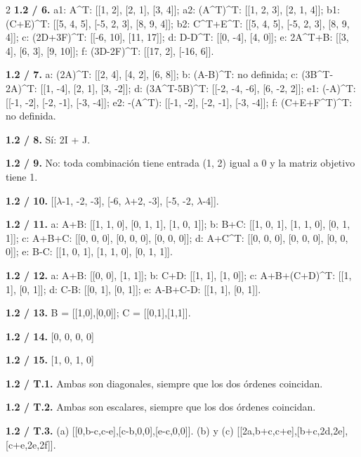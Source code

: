 \documentclass[11pt,a4paper,landscape]{article}
\begin{document}
\begin{multicols}{2}
\textbf{1.2 / 6.} a1: A\textasciicircum{}T: [[1, 2], [2, 1], [3, 4]]; a2: (A\textasciicircum{}T)\textasciicircum{}T: [[1, 2, 3], [2, 1, 4]]; b1: (C+E)\textasciicircum{}T: [[5, 4, 5], [-5, 2, 3], [8, 9, 4]]; b2: C\textasciicircum{}T+E\textasciicircum{}T: [[5, 4, 5], [-5, 2, 3], [8, 9, 4]]; c: (2D+3F)\textasciicircum{}T: [[-6, 10], [11, 17]]; d: D-D\textasciicircum{}T: [[0, -4], [4, 0]]; e: 2A\textasciicircum{}T+B: [[3, 4], [6, 3], [9, 10]]; f: (3D-2F)\textasciicircum{}T: [[17, 2], [-16, 6]].\par\smallskip
\textbf{1.2 / 7.} a: (2A)\textasciicircum{}T: [[2, 4], [4, 2], [6, 8]]; b: (A-B)\textasciicircum{}T: no definida; c: (3B\textasciicircum{}T-2A)\textasciicircum{}T: [[1, -4], [2, 1], [3, -2]]; d: (3A\textasciicircum{}T-5B)\textasciicircum{}T: [[-2, -4, -6], [6, -2, 2]]; e1: (-A)\textasciicircum{}T: [[-1, -2], [-2, -1], [-3, -4]]; e2: -(A\textasciicircum{}T): [[-1, -2], [-2, -1], [-3, -4]]; f: (C+E+F\textasciicircum{}T)\textasciicircum{}T: no definida.\par\smallskip
\textbf{1.2 / 8.} Sí: 2I + J.\par\smallskip
\textbf{1.2 / 9.} No: toda combinación tiene entrada (1, 2) igual a 0 y la matriz objetivo tiene 1.\par\smallskip
\textbf{1.2 / 10.} [[$\lambda$-1, -2, -3], [-6, $\lambda$+2, -3], [-5, -2, $\lambda$-4]].\par\smallskip
\textbf{1.2 / 11.} a: A+B: [[1, 1, 0], [0, 1, 1], [1, 0, 1]]; b: B+C: [[1, 0, 1], [1, 1, 0], [0, 1, 1]]; c: A+B+C: [[0, 0, 0], [0, 0, 0], [0, 0, 0]]; d: A+C\textasciicircum{}T: [[0, 0, 0], [0, 0, 0], [0, 0, 0]]; e: B-C: [[1, 0, 1], [1, 1, 0], [0, 1, 1]].\par\smallskip
\textbf{1.2 / 12.} a: A+B: [[0, 0], [1, 1]]; b: C+D: [[1, 1], [1, 0]]; c: A+B+(C+D)\textasciicircum{}T: [[1, 1], [0, 1]]; d: C-B: [[0, 1], [0, 1]]; e: A-B+C-D: [[1, 1], [0, 1]].\par\smallskip
\textbf{1.2 / 13.} B = [[1,0],[0,0]]; C = [[0,1],[1,1]].\par\smallskip
\textbf{1.2 / 14.} [0, 0, 0, 0]\par\smallskip
\textbf{1.2 / 15.} [1, 0, 1, 0]\par\smallskip
\textbf{1.2 / T.1.} Ambas son diagonales, siempre que los dos órdenes coincidan.\par\smallskip
\textbf{1.2 / T.2.} Ambas son escalares, siempre que los dos órdenes coincidan.\par\smallskip
\textbf{1.2 / T.3.} (a) [[0,b-c,c-e],[c-b,0,0],[e-c,0,0]]. (b) y (c) [[2a,b+c,c+e],[b+c,2d,2e],[c+e,2e,2f]].\par\smallskip

\end{multicols}
\end{document}
